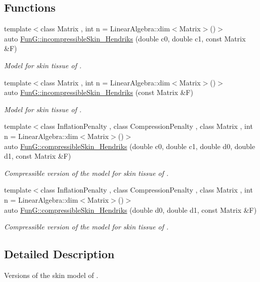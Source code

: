 \subsection*{Functions}
\begin{DoxyCompactItemize}
\item 
{\footnotesize template$<$class Matrix , int n = Linear\+Algebra\+::dim$<$\+Matrix$>$()$>$ }\\auto \hyperlink{group__Biomechanics_gaa20bf15ef6976d64d89490429035b2c4}{Fun\+G\+::incompressible\+Skin\+\_\+\+Hendriks} (double c0, double c1, const Matrix \&F)
\begin{DoxyCompactList}\small\item\em Model for skin tissue of \cite{Hendriks2005}. \end{DoxyCompactList}\item 
{\footnotesize template$<$class Matrix , int n = Linear\+Algebra\+::dim$<$\+Matrix$>$()$>$ }\\auto \hyperlink{group__Biomechanics_gad8653218bd2afb4e3cfd601a5142956c}{Fun\+G\+::incompressible\+Skin\+\_\+\+Hendriks} (const Matrix \&F)
\begin{DoxyCompactList}\small\item\em Model for skin tissue of \cite{Hendriks2005}. \end{DoxyCompactList}\item 
{\footnotesize template$<$class Inflation\+Penalty , class Compression\+Penalty , class Matrix , int n = Linear\+Algebra\+::dim$<$\+Matrix$>$()$>$ }\\auto \hyperlink{group__Biomechanics_ga07b4c52c6ecf7e72f73ab5832fb262cd}{Fun\+G\+::compressible\+Skin\+\_\+\+Hendriks} (double c0, double c1, double d0, double d1, const Matrix \&F)
\begin{DoxyCompactList}\small\item\em Compressible version of the model for skin tissue of \cite{Hendriks2005}. \end{DoxyCompactList}\item 
{\footnotesize template$<$class Inflation\+Penalty , class Compression\+Penalty , class Matrix , int n = Linear\+Algebra\+::dim$<$\+Matrix$>$()$>$ }\\auto \hyperlink{group__Biomechanics_ga42721e772b7eada1b0bca98247ad440f}{Fun\+G\+::compressible\+Skin\+\_\+\+Hendriks} (double d0, double d1, const Matrix \&F)
\begin{DoxyCompactList}\small\item\em Compressible version of the model for skin tissue of \cite{Hendriks2005}. \end{DoxyCompactList}\end{DoxyCompactItemize}


\subsection{Detailed Description}
Versions of the skin model of \cite{Hendriks2005}. 

